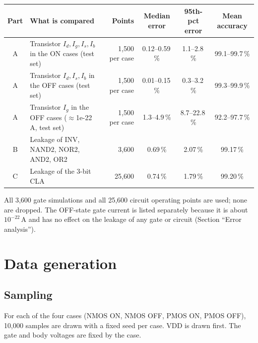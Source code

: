 \documentclass[10pt]{article}
\newcommand{\pct}{\,\%}
\begin{document}
\begin{table}[H]
\centering
\small
\begin{tabularx}{\textwidth}{@{}c L r c c c@{}}
\toprule
Part & What is compared & Points & Median error & 95th-pct error & Mean accuracy \\
\midrule
A & Transistor $I_d, I_g, I_s, I_b$ in the ON cases (test set) & 1,500 per case & 0.12--0.59\pct & 1.1--2.8\pct & 99.1--99.7\pct \\
A & Transistor $I_d, I_s, I_b$ in the OFF cases (test set) & 1,500 per case & 0.01--0.15\pct & 0.3--3.2\pct & 99.3--99.9\pct \\
A & Transistor $I_g$ in the OFF cases ($\approx$1e-22\,A, test set) & 1,500 per case & 1.3--4.9\pct & 8.7--22.8\pct & 92.2--97.7\pct \\
B & Leakage of INV, NAND2, NOR2, AND2, OR2 & 3,600 & 0.69\pct & 2.07\pct & 99.17\pct \\
C & Leakage of the 3-bit CLA & 25,600 & 0.74\pct & 1.79\pct & 99.20\pct \\
\bottomrule
\end{tabularx}
\end{table}

All 3,600 gate simulations and all 25,600 circuit operating points are used; none are dropped.
The OFF-state gate current is listed separately because it is about $10^{-22}$\,A and has no
effect on the leakage of any gate or circuit (Section ``Error analysis'').

\section{Data generation}

\subsection*{Sampling}

For each of the four cases (NMOS ON, NMOS OFF, PMOS ON, PMOS OFF), 10,000 samples are drawn with a
fixed seed per case. VDD is drawn first. The gate and body voltages are fixed by the case.
\end{document}
